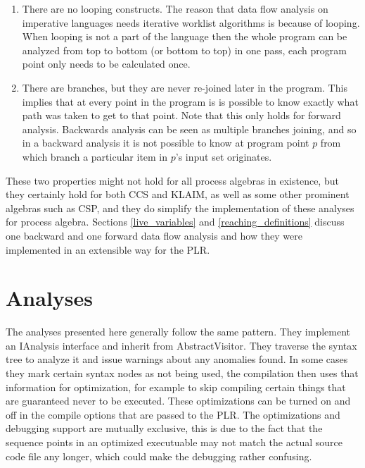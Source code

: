 	\begin{enumerate}
		\item There are no looping constructs. The reason that data flow analysis 
		on imperative languages needs iterative worklist algorithms is because of 
		looping. When looping is not a part of the language then the whole program 
		can be analyzed from top to bottom (or bottom to top) in one pass, each 
		program point only needs to be calculated once.
		
		\item There are branches, but they are never re-joined later in the 
		program. This implies that at every point in the program is is possible to 
		know exactly what path was taken to get to that point. Note that this only 
		holds for forward analysis. Backwards analysis can be seen as multiple 
		branches joining, and so in a backward analysis it is not possible to know 
		at program point $p$ from which branch a particular item in $p$'s input 
		set originates.
		
	\end{enumerate}

	These two properties might not hold for all process algebras in existence, 
	but they certainly hold for both CCS and KLAIM, as well as some other 
	prominent algebras such as CSP, and they do simplify the implementation of 
	these analyses for process algebra. Sections \ref{live_variables} and 
	\ref{reaching_definitions} discuss one backward and one forward data flow 
	analysis and how they were implemented in an extensible way for the PLR.
	
\section{Analyses}
	
	The analyses presented here generally follow the same pattern. They implement
	an \textsf{IAnalysis} interface and inherit from \textsf{AbstractVisitor}. 
	They traverse the syntax tree to analyze it and issue warnings about any
	anomalies found. In some cases they mark certain syntax nodes as not being
	used, the compilation then uses that information for optimization, for example
	to skip compiling certain things that are guaranteed never to be executed. 
	These optimizations can be turned on and off in the compile options that
	are passed to the PLR. The optimizations and debugging support are mutually
	exclusive, this is due to the fact that the sequence points in an optimized
	executuable may not match the actual source code file any longer, which could
	make the debugging rather confusing.
	
